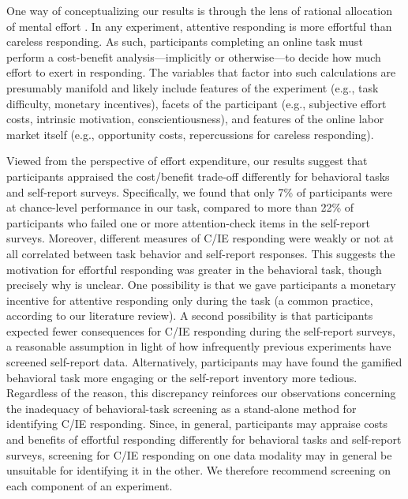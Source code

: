 \documentclass[a4paper,notitlepage,12pt]{article}
\begin{document}
\begin{refsection}[main]
One way of conceptualizing our results is through the lens of rational allocation of mental effort \cite{kool2018mental}. In any experiment, attentive responding is more effortful than careless responding. As such, participants completing an online task must perform a cost-benefit analysis---implicitly or otherwise---to decide how much effort to exert in responding. The variables that factor into such calculations are presumably manifold and likely include features of the experiment (e.g., task difficulty, monetary incentives), facets of the participant (e.g., subjective effort costs, intrinsic motivation, conscientiousness), and features of the online labor market itself (e.g., opportunity costs, repercussions for careless responding). 

Viewed from the perspective of effort expenditure, our results suggest that participants appraised the cost/benefit trade-off differently for behavioral tasks and self-report surveys. Specifically, we found that only 7\% of participants were at chance-level performance in our task, compared to more than 22\% of participants who failed one or more attention-check items in the self-report surveys. Moreover, different measures of C/IE responding were weakly or not at all correlated between task behavior and self-report responses. This suggests the motivation for effortful responding was greater in the behavioral task, though precisely why is unclear. One possibility is that we gave participants a monetary incentive for attentive responding only during the task (a common practice, according to our literature review). A second possibility is that participants expected fewer consequences for C/IE responding during the self-report surveys, a reasonable assumption in light of how infrequently previous experiments have screened self-report data. Alternatively, participants may have found the gamified behavioral task more engaging or the self-report inventory more tedious. Regardless of the reason, this discrepancy reinforces our observations concerning the inadequacy of behavioral-task screening as a stand-alone method for identifying C/IE responding. Since, in general, participants may appraise costs and benefits of effortful responding differently for behavioral tasks and self-report surveys, screening for C/IE responding on one data modality may in general be unsuitable for identifying it in the other. We therefore recommend screening on each component of an experiment.


\end{refsection}
\end{document}
